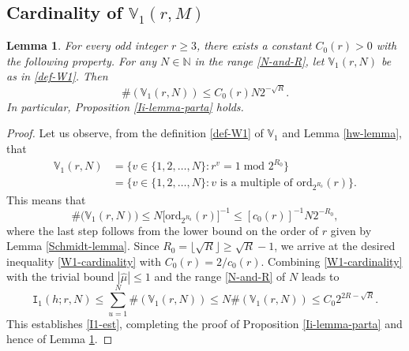 \documentclass[12pt, twoside]{article}
\newtheorem{lemma}[theorem]{Lemma}
\theoremstyle{definition}
\numberwithin{equation}{section}
\begin{document}
\subsection{Cardinality of $\mathbb V_1(r, M)$}
\begin{lemma} \label{I1-lemma}
For every odd integer $r \geq 3$, there exists a constant $C_0(r) > 0$ with the following property. For any $N \in \mathbb N$ in the range \eqref{N-and-R}, let $\mathbb V_1(r, N)$ be as in \eqref{def-W1}. Then 
\begin{equation} \label{W1-cardinality}
\#(\mathbb V_1(r, N)) \leq C_0(r) N 2^{-\sqrt{R}}. 
\end{equation} 
In particular, Proposition \ref{Ii-lemma-parta} holds. 
\end{lemma}  
\begin{proof} 
Let us observe, from the definition \eqref{def-W1} of $\mathbb V_1$ and Lemma \ref{hw-lemma}, that 
\begin{align*} 
\mathbb V_1(r, N) &= \bigl\{v \in \{1, 2, \ldots, N\} : r^v = 1 \; \text{mod } 2^{R_0} \bigr\} \\
&= \bigl\{v \in \{1, 2, \ldots, N\} : v \text{ is a multiple of } \text{ord}_{2^{R_0}}(r) \bigr\}.
\end{align*}
This means that 
\[ \#\bigl(\mathbb V_1(r, N)\bigr) \leq N\bigl[\text{ord}_{2^{R_0}}(r) \bigr]^{-1} \leq [c_0(r)]^{-1} N2^{-R_0},  \]    
where the last step follows from the lower bound on the order of $r$ given by Lemma \ref{Schmidt-lemma}. Since $R_0 = \lfloor \sqrt{R} \rfloor \geq \sqrt{R} - 1$,
we arrive at the desired inequality \eqref{W1-cardinality} with $C_0(r) = 2/c_0(r)$. 
\vskip0.1in 
\noindent Combining \eqref{W1-cardinality} with the trivial bound $|\widehat{\mu}| \leq 1$ and the range \eqref{N-and-R} of $N$ leads to
\[ \mathtt I_1(h;r, N) \leq  \sum_{u=1}^N \#(\mathbb V_1(r, N)) \leq N \#(\mathbb V_1(r, N)) \leq C_0 2^{2R-\sqrt{R}}.  \]
This establishes \eqref{I1-est}, completing the proof of Proposition \ref{Ii-lemma-parta} and hence of Lemma \ref{I1-lemma}.  
\end{proof} 
\end{document}

